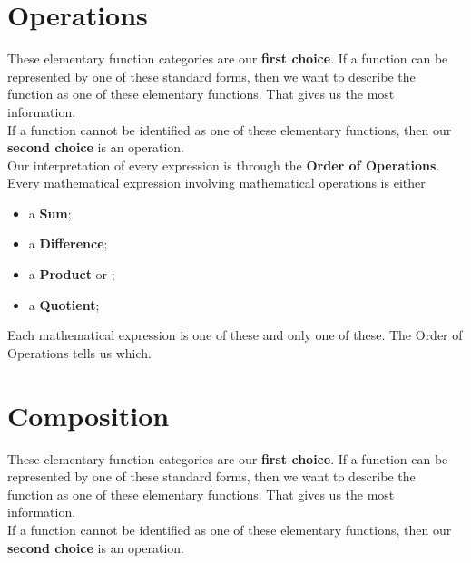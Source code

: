 \documentclass{ximera}
\begin{document}
\section*{Operations}


These elementary function categories are our \textbf{first choice}.  If a function can be represented by one of these standard forms, then we want to describe the function as one of these elementary functions.  That gives us the most information. \\


If a function cannot be identified as one of these elementary functions, then our \textbf{second choice} is an operation. \\


Our interpretation of every expression is through the \textbf{\textcolor{purple!85!blue}{Order of Operations}}. \\

Every mathematical expression involving mathematical operations is either

\begin{itemize}
	\item a \textbf{Sum};
	\item a \textbf{Difference};
	\item a \textbf{Product} or ;
	\item a \textbf{Quotient};
\end{itemize}



Each mathematical expression is one of these and only one of these.  The Order of Operations tells us which.













\section*{Composition}


These elementary function categories are our \textbf{first choice}.  If a function can be represented by one of these standard forms, then we want to describe the function as one of these elementary functions.  That gives us the most information. \\


If a function cannot be identified as one of these elementary functions, then our \textbf{second choice} is an operation. \\
\end{document}
